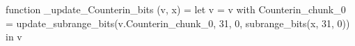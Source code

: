 function _update_Counterin_bits (v, x) = let v = { v with Counterin_chunk_0 = update_subrange_bits(v.Counterin_chunk_0, 31, 0, subrange_bits(x, 31, 0)) } in
  v

